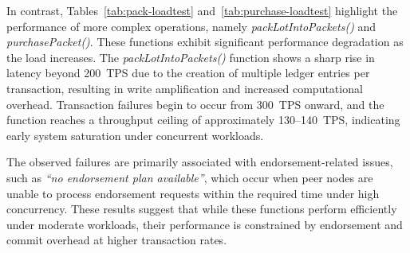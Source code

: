 \documentclass[12pt]{article}
\begin{document}
	\begin{table}[h]
		\centering
		\caption{Performance Results for \texttt{makeOffer} (Payload: 41 bytes) under Varying Load}
		
		
		\label{tab:makeoffer-loadtest}
	\end{table}
	
	In contrast, Tables~\ref{tab:pack-loadtest} and~\ref{tab:purchase-loadtest} highlight the performance of more complex operations, namely \textit{packLotIntoPackets()} and \textit{purchasePacket()}. These functions exhibit significant performance degradation as the load increases. The \textit{packLotIntoPackets()} function shows a sharp rise in latency beyond 200~TPS due to the creation of multiple ledger entries per transaction, resulting in write amplification and increased computational overhead. Transaction failures begin to occur from 300~TPS onward, and the function reaches a throughput ceiling of approximately 130--140~TPS, indicating early system saturation under concurrent workloads.
	
	
	The observed failures are primarily associated with endorsement-related issues, such as \textit{``no endorsement plan available''}, which occur when peer nodes are unable to process endorsement requests within the required time under high concurrency. These results suggest that while these functions perform efficiently under moderate workloads, their performance is constrained by endorsement and commit overhead at higher transaction rates.
	
\end{document}
